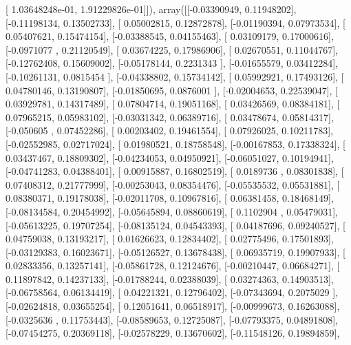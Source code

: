 \documentclass{article}
\begin{document}
       [  1.03648248e-01,   1.91229826e-01]]), array([[-0.03390949,  0.11948202],
       [-0.11198134,  0.13502733],
       [ 0.05002815,  0.12872878],
       [-0.01190394,  0.07973534],
       [ 0.05407621,  0.15474154],
       [-0.03388545,  0.04155463],
       [ 0.03109179,  0.17000616],
       [-0.0971077 ,  0.21120549],
       [ 0.03674225,  0.17986906],
       [ 0.02670551,  0.11044767],
       [-0.12762408,  0.15609002],
       [-0.05178144,  0.2231343 ],
       [-0.01655579,  0.03412284],
       [-0.10261131,  0.0815454 ],
       [-0.04338802,  0.15734142],
       [ 0.05992921,  0.17493126],
       [ 0.04780146,  0.13190807],
       [-0.01850695,  0.0876001 ],
       [-0.02004653,  0.22539047],
       [ 0.03929781,  0.14317489],
       [ 0.07804714,  0.19051168],
       [ 0.03426569,  0.08384181],
       [ 0.07965215,  0.05983102],
       [-0.03031342,  0.06389716],
       [ 0.03478674,  0.05814317],
       [-0.050605  ,  0.07452286],
       [ 0.00203402,  0.19461554],
       [ 0.07926025,  0.10211783],
       [-0.02552985,  0.02717024],
       [ 0.01980521,  0.18758548],
       [-0.00167853,  0.17338324],
       [ 0.03437467,  0.18809302],
       [-0.04234053,  0.04950921],
       [-0.06051027,  0.10194941],
       [-0.04741283,  0.04388401],
       [ 0.00915887,  0.16802519],
       [ 0.0189736 ,  0.08301838],
       [ 0.07408312,  0.21777999],
       [-0.00253043,  0.08354476],
       [-0.05535532,  0.05531881],
       [ 0.08380371,  0.19178038],
       [-0.02011708,  0.10967816],
       [ 0.06381458,  0.18468149],
       [-0.08134584,  0.20454992],
       [-0.05645894,  0.08860619],
       [ 0.1102904 ,  0.05479031],
       [-0.05613225,  0.19707254],
       [-0.08135124,  0.04543393],
       [ 0.04187696,  0.09240527],
       [ 0.04759038,  0.13193217],
       [ 0.01626623,  0.12834402],
       [ 0.02775496,  0.17501893],
       [-0.03129383,  0.16023671],
       [-0.05126527,  0.13678438],
       [ 0.06935719,  0.19907933],
       [ 0.02833356,  0.13257141],
       [-0.05861728,  0.12124676],
       [-0.00210447,  0.06684271],
       [ 0.11897842,  0.14237133],
       [-0.01788244,  0.02388039],
       [ 0.03274363,  0.14903513],
       [-0.06758564,  0.06134419],
       [ 0.04221321,  0.12796402],
       [-0.07343694,  0.2075029 ],
       [-0.02624818,  0.03655254],
       [ 0.12051641,  0.06518917],
       [-0.00999673,  0.16263088],
       [-0.0325636 ,  0.11753443],
       [-0.08589653,  0.12725087],
       [-0.07793375,  0.04891808],
       [-0.07454275,  0.20369118],
       [-0.02578229,  0.13670602],
       [-0.11548126,  0.19894859],
\end{document}
